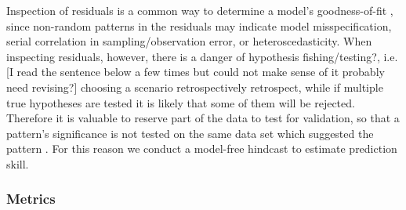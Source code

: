 Inspection of residuals is a common way to determine a model’s goodness-of-fit \parencite{cox1968general}, since  non-random patterns in the residuals may indicate model misspecification, serial correlation in sampling/observation error, or heteroscedasticity. When inspecting residuals, however, there is a danger of hypothesis fishing/testing?, i.e. [I read the sentence below a few times but could not make sense of it probably need revising?] choosing a scenario retrospectively retrospect, while if multiple true hypotheses are tested it is likely that some of them will be rejected. Therefore it is valuable to reserve part of the data to test for validation, so that a pattern’s significance is not tested on the same data set which suggested the pattern \parencite{thygesen2017validation}. For this reason we conduct a model-free hindcast to estimate prediction skill.

\subsubsection{Metrics}


